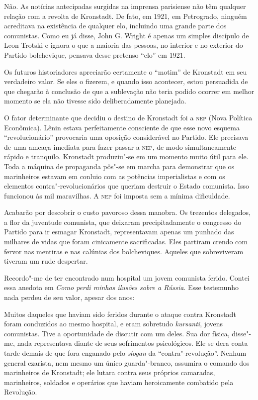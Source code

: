 Não. As notícias antecipadas surgidas na imprensa parisiense não têm
qualquer relação com a revolta de Kronstadt. De fato, em 1921, em
Petrogrado, ninguém acreditava na existência de qualquer elo,
incluindo uma grande parte dos comunistas. Como eu já disse, John G.
Wright é apenas um simples discípulo de Leon Trotski e ignora o que a
maioria das pessoas, no interior e no exterior do Partido bolchevique,
pensava desse pretenso “elo” em 1921.

Os futuros historiadores apreciarão certamente o “motim” de Kronstadt em
seu verdadeiro valor. Se eles o fizerem, e quando isso acontecer,
estou persuadida de que chegarão à conclusão de que a sublevação não
teria podido ocorrer em melhor momento se ela não tivesse sido
deliberadamente planejada.

O fator determinante que decidiu o destino de Kronstadt foi a \textsc{nep}
(Nova Política Econômica). Lênin estava perfeitamente consciente de que
esse novo esquema “revolucionário” provocaria uma oposição considerável
no Partido. Ele precisava de uma ameaça imediata para fazer passar a
\textsc{nep}, de modo simultaneamente rápido e tranquilo. Kronstadt
produziu"-se em um momento muito útil para ele. Toda a máquina de
propaganda pôs"-se em marcha para demonstrar que os marinheiros
estavam em conluio com as potências imperialistas e com os elementos
contra"-revolucionários que queriam destruir o Estado comunista. Isso
funcionou às mil maravilhas. A \textsc{nep} foi imposta sem a mínima
dificuldade.

Acabarão por descobrir o custo pavoroso dessa manobra. Os trezentos
delegados, a flor da juventude comunista, que deixaram precipitadamente
o congresso do Partido para ir esmagar Kronstadt, representavam apenas
um punhado das milhares de vidas que foram cinicamente sacrificadas.
Eles partiram crendo com fervor nas mentiras e nas calúnias dos
bolcheviques. Aqueles que sobreviveram tiveram um rude despertar.

Recordo"-me de ter encontrado num hospital um jovem comunista ferido.
Contei essa anedota em \textit{Como perdi minhas ilusões sobre a Rússia}. Esse
testemunho nada perdeu de seu valor, apesar dos anos:

\begin{hedraquote}
Muitos daqueles que haviam sido feridos durante o ataque contra
Kronstadt foram conduzidos ao mesmo hospital, e eram sobretudo
\textit{kursanti}, jovens comunistas. Tive a oportunidade de discutir com um
deles. Sua dor física, disse"-me, nada representava diante de seus
sofrimentos psicológicos. Ele se dera conta tarde demais de que fora
enganado pelo \textit{slogan} da “contra"-revolução”. Nenhum general
czarista, nem mesmo um único guarda"-branco, assumira o comando dos
marinheiros de Kronstadt; ele lutara contra seus próprios camaradas,
marinheiros, soldados e operários que haviam heroicamente combatido
pela Revolução.
\end{hedraquote}


